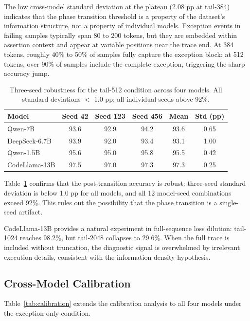 \documentclass[11pt]{article}
\begin{document}
The low cross-model standard deviation at the plateau (2.08 pp at tail-384) indicates that the phase transition threshold is a property of the dataset's information structure, not a property of individual models. Exception events in failing samples typically span 80 to 200 tokens, but they are embedded within assertion context and appear at variable positions near the trace end. At 384 tokens, roughly 40\% to 50\% of samples fully capture the exception block; at 512 tokens, over 90\% of samples include the complete exception, triggering the sharp accuracy jump.

\begin{table}[t]
\centering
\caption{Three-seed robustness for the tail-512 condition across four models. All standard deviations $<$ 1.0 pp; all individual seeds above 92\%.}
\label{tab:crossseed}
\small
\begin{tabular}{lccccc}
\toprule
\textbf{Model} & \textbf{Seed 42} & \textbf{Seed 123} & \textbf{Seed 456} & \textbf{Mean} & \textbf{Std (pp)} \\
\midrule
Qwen-7B & 93.6 & 92.9 & 94.2 & 93.6 & 0.65 \\
DeepSeek-6.7B & 93.9 & 92.0 & 93.4 & 93.1 & 1.00 \\
Qwen-1.5B & 95.6 & 95.0 & 95.8 & 95.5 & 0.42 \\
CodeLlama-13B & 97.5 & 97.0 & 97.3 & 97.3 & 0.25 \\
\bottomrule
\end{tabular}
\end{table}

Table~\ref{tab:crossseed} confirms that the post-transition accuracy is robust: three-seed standard deviation is below 1.0 pp for all models, and all 12 model-seed combinations exceed 92\%. This rules out the possibility that the phase transition is a single-seed artifact.

CodeLlama-13B provides a natural experiment in full-sequence loss dilution: tail-1024 reaches 98.2\%, but tail-2048 collapses to 29.6\%. When the full trace is included without truncation, the diagnostic signal is overwhelmed by irrelevant execution details, consistent with the information density hypothesis.

\subsection{Cross-Model Calibration}
\label{sec:calibration}

Table~\ref{tab:calibration} extends the calibration analysis to all four models under the exception-only condition.
\end{document}
